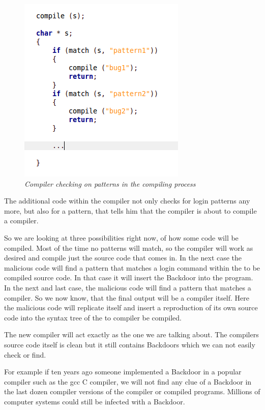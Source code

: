 \documentclass[a4paper, 12pt]{article}
\begin{document}
\begin{figure}[h]
\begin{center}
\includegraphics[keepaspectratio=true, scale=0.8]{compiler_match_pattern.png}
\end{center}
\caption{\emph{Compiler checking on patterns in the compiling process}}
\end{figure}

The additional code within the compiler not only checks for login patterns any more, but also for a pattern, that tells him that the compiler is about to compile a compiler.

So we are looking at three possibilities right now, of how some code will be compiled. Most of the time no patterns will match, so the compiler will work as desired and compile just the source code that comes in. In the next case the malicious code will find a pattern that matches a login command within the to be compiled source code. In that case it will insert the Backdoor into the program. In the next and last case, the malicious code will find a pattern that matches a compiler. So we now know, that the final output will be a compiler itself. Here the malicious code will replicate itself and insert a reproduction of its own source code into the syntax tree of the to compiler be compiled.

The new compiler will act exactly as the one we are talking about. The compilers source code itself is clean but it still contains Backdoors which we can not easily check or find.

For example if ten years ago someone implemented a Backdoor in a popular compiler such as the gcc C compiler, we will not find any clue of a Backdoor in the last dozen compiler versions of the compiler or compiled programs. Millions of computer systems could still be infected with a Backdoor.
\end{document}

